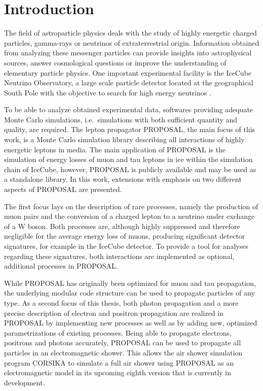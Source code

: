 \chapter{Introduction}

The field of astroparticle physics deals with the study of highly energetic charged particles, gamma-rays or neutrinos of extraterrestrial origin.
Information obtained from analyzing these messenger particles can provide insights into astrophysical sources, answer cosmological questions or improve the understanding of elementary particle physics.
One important experimental facility is the IceCube Neutrino Observatory, a large scale particle detector located at the geographical South Pole with the objective to search for high energy neutrinos \cite{Aartsen_2017}.

To be able to analyze obtained experimental data, softwares providing adequate Monte Carlo simulations, i.e.\ simulations with both sufficient quantity and quality, are required. 
The lepton propagator PROPOSAL, the main focus of this work, is a Monte Carlo simulation library describing all interactions of highly energetic leptons in media.
The main application of PROPOSAL is the simulation of energy losses of muon and tau leptons in ice within the simulation chain of IceCube, however, PROPOSAL is publicly available and may be used as a standalone library.
In this work, extensions with emphasis on two different aspects of PROPOSAL are presented.

The first focus lays on the description of rare processes, namely the production of muon pairs and the conversion of a charged lepton to a neutrino under exchange of a W boson.
Both processes are, although highly suppressed and therefore negligible for the average energy loss of muons, producing significant detector signatures, for example in the IceCube detector.
To provide a tool for analyses regarding these signatures, both interactions are implemented as optional, additional processes in PROPOSAL.

While PROPOSAL has originally been optimized for muon and tau propagation, the underlying modular code structure can be used to propagate particles of any type.
As a second focus of this thesis, both photon propagation and a more precise description of electron and positron propagation are realized in PROPOSAL by implementing new processes as well as by adding new, optimized parametrizations of existing processes.
Being able to propagate electrons, positrons and photons accurately, PROPOSAL can be used to propagate all particles in an electromagnetic shower.
This allows the air shower simulation program CORSIKA to simulate a full air shower using PROPOSAL as an electromagnetic model in its upcoming eighth version that is currently in development.

